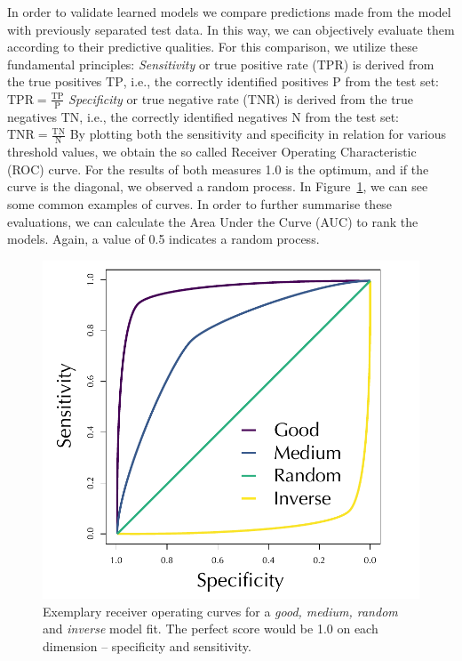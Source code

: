 \documentclass[conference]{IEEEtran}
\begin{document}
In order to validate learned models we compare predictions made from the model with previously separated test data. In this way, we can objectively evaluate them according to their predictive qualities. For this comparison, we utilize these fundamental principles:
\newline \textit{Sensitivity} or true positive rate ($\mathrm{TPR}$) is derived from the true positives $\mathrm{TP}$,  i.e., the correctly identified positives $\mathrm{P}$ from the test set: 
$
\mathrm{TPR}=\frac{\mathrm{TP}}{\mathrm{P}}
$
\newline \textit{Specificity} or true negative rate ($\mathrm{TNR}$) is derived from the true negatives $\mathrm{TN}$,  i.e., the correctly identified negatives $\mathrm{N}$ from the test set: 
$
\mathrm{TNR}=\frac{\mathrm{TN}}{\mathrm{N}}
$
\newline By plotting both the sensitivity and specificity in relation for various threshold values, we obtain the so called Receiver Operating Characteristic (ROC) curve. For the results of both measures 1.0 is the optimum, and if the curve is the diagonal, we observed a random process.  In Figure~\ref{fig:exroc}, we can see some common examples of curves. In order to further summarise these evaluations, we can calculate the Area Under the Curve (AUC) to rank the models. Again, a value of 0.5 indicates a random process.  \cite{Hastie2009}  \cite{Kauermann2021}  \cite{Russell2021}

\begin{figure}[h!]
\centering
\includegraphics[width=.65\linewidth]{pictures/ROC.pdf}
\caption[ROC explanation]{Exemplary receiver operating curves for  a \textit{good, medium, random} and \textit{inverse} model fit. The perfect score would be 1.0 on each dimension -- specificity and sensitivity.}
\label{fig:exroc}
\end{figure}
\end{document}
